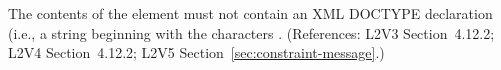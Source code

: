 The contents of the  element must not contain an XML
DOCTYPE declaration (i.e., a string beginning with the characters
.  (References: L2V3 Section~4.12.2; L2V4 Section~4.12.2; L2V5 Section~\ref{sec:constraint-message}.)
